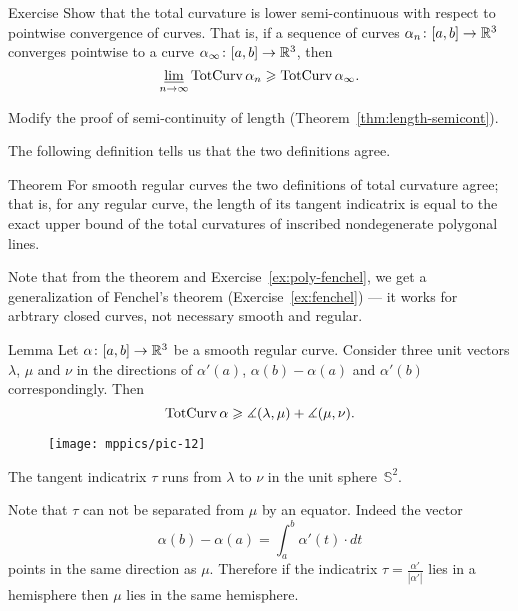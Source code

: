 \begin{thm}{Exercise}
Show that the total curvature is lower semi-continuous with respect to pointwise convergence of curves.
That is, if a sequence
of curves $\alpha_n\colon[a,b]\to \mathbb{R}^3$ converges pointwise 
to a curve $\alpha_\infty\:[a,b]\z\to \RR^3$, then 
\[\varliminf_{n\to\infty} \mathop{\rm TotCurv}\nolimits\alpha_n \geqslant \mathop{\rm TotCurv}\nolimits\alpha_\infty.\]
\end{thm}

 Modify the proof of semi-continuity of length (Theorem~\ref{thm:length-semicont}).


The following definition tells us that the two definitions agree.

\begin{thm}{Theorem}\label{thm:total-curvature=}
For smooth regular curves the two definitions of total curvature agree;
that is, for any regular curve, the length of its tangent indicatrix is equal to the exact upper bound of the total curvatures of inscribed nondegenerate polygonal lines.
\end{thm}

Note that from the theorem and Exercise~\ref{ex:poly-fenchel}, we get a generalization of Fenchel's theorem (Exercise~\ref{ex:fenchel}) --- it works for arbtrary closed curves, not necessary smooth and regular.

\begin{thm}{Lemma}\label{lem:uvw}
Let $\alpha\colon[a,b]\to\mathbb{R}^3$ be a smooth regular curve.
Consider three unit vectors $\lambda$, $\mu$ and $\nu$ in the directions of
$\alpha'(a)$, $\alpha(b)-\alpha(a)$ and $\alpha'(b)$ correspondingly.
Then 
\[\mathop{\rm TotCurv}\nolimits\alpha\geqslant\measuredangle (\lambda,\mu)+\measuredangle (\mu,\nu).\]
\end{thm}

\begin{wrapfigure}{r}{45 mm}
\vskip-7mm
\centering
\texttt{[image: mppics/pic-12]}
\vskip0mm
\end{wrapfigure}

The tangent indicatrix $\tau$ runs from $\lambda$ to $\nu$ in the unit sphere~$\mathbb{S}^2$.

Note that $\tau$ can not be separated from $\mu$ by an equator.
Indeed the vector 
\[\alpha(b)-\alpha(a)=\int_a^b\alpha'(t)\cdot dt\]
points in the same direction as $\mu$.
Therefore if the indicatrix $\tau=\tfrac{\alpha'}{|\alpha'|}$ lies in a hemisphere then $\mu$ lies in the same hemisphere. 

